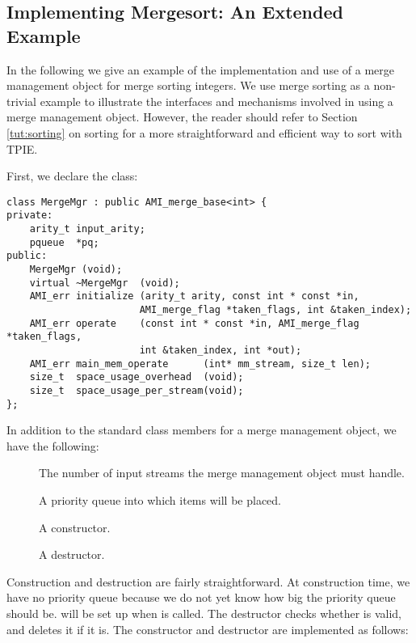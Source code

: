 \subsection{Implementing Mergesort: An Extended Example}

In the following we give an example of the implementation and
use of a merge management object for merge sorting integers.
We use merge sorting as a non-trivial example to illustrate
the interfaces and mechanisms involved in using a merge
management object. However, the reader should refer to
Section \ref{tut:sorting} on sorting for a more
straightforward and efficient way to sort with TPIE.

First, we declare the class:


\begin{verbatim}
class MergeMgr : public AMI_merge_base<int> { 
private:
    arity_t input_arity;
    pqueue  *pq;
public:
    MergeMgr (void);
    virtual ~MergeMgr  (void);
    AMI_err initialize (arity_t arity, const int * const *in,
                       AMI_merge_flag *taken_flags, int &taken_index);
    AMI_err operate    (const int * const *in, AMI_merge_flag *taken_flags,
                       int &taken_index, int *out);
    AMI_err main_mem_operate      (int* mm_stream, size_t len);
    size_t  space_usage_overhead  (void);
    size_t  space_usage_per_stream(void);
};
\end{verbatim}

In addition to the standard class members for a merge management
object, we have the following:

\begin{description}
    \item[] The number of input streams
    the merge management object must handle.
    \item[] A priority queue into which items
    will be placed.
    \item[] A constructor.
    \item[] A destructor.
\end{description}

Construction and destruction are fairly straightforward.  At construction
time, we have no priority queue because we do not yet know how big the
priority queue should be.   will be set up when 
is called.  The destructor checks whether
 is valid, and deletes it if it is.  The constructor and
destructor are implemented as follows:

